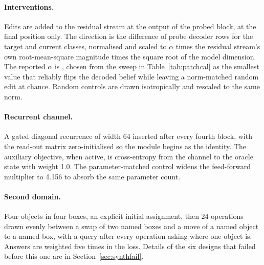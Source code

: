 \paragraph{Interventions.} Edits are added to the residual stream at the output of
the probed block, at the final position only. The direction is the difference of
probe decoder rows for the target and current classes, normalised and scaled to
$\alpha$ times the residual stream's own root-mean-square magnitude times the
square root of the model dimension. The reported $\alpha$ is ,
chosen from the sweep in Table~\ref{tab:patchcal} as the smallest value that
reliably flips the decoded belief while leaving a norm-matched random edit at
chance. Random controls are drawn isotropically and rescaled to the same norm.

\paragraph{Recurrent channel.} A gated diagonal recurrence of width 64 inserted
after every fourth block, with the read-out matrix zero-initialised so the module
begins as the identity. The auxiliary objective, when active, is cross-entropy
from the channel to the oracle state with weight 1.0. The parameter-matched
control widens the feed-forward multiplier to 4.156 to absorb the same parameter
count.

\paragraph{Second domain.} Four objects in four boxes, an explicit initial
assignment, then 24 operations drawn evenly between a swap of two named boxes and
a move of a named object to a named box, with a query after every operation
asking where one object is. Answers are weighted five times in the loss. Details
of the six designs that failed before this one are in Section~\ref{sec:synthfail}.
